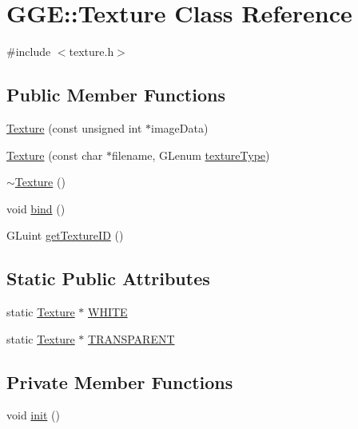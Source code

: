 \hypertarget{class_g_g_e_1_1_texture}{\section{G\+G\+E\+:\+:Texture Class Reference}
\label{class_g_g_e_1_1_texture}
}


{\ttfamily \#include $<$texture.\+h$>$}

\subsection*{Public Member Functions}
\begin{DoxyCompactItemize}
\item 
\hyperlink{class_g_g_e_1_1_texture_af70bbf244600091e968aefc1ab27b73f}{Texture} (const unsigned int $\ast$image\+Data)
\item 
\hyperlink{class_g_g_e_1_1_texture_a3978c92ae0d7bec3aef3006d1cac802b}{Texture} (const char $\ast$filename, G\+Lenum \hyperlink{class_g_g_e_1_1_texture_a9fd9a4cf0a84fcd68b336c92d6d0514e}{texture\+Type})
\item 
\hyperlink{class_g_g_e_1_1_texture_a62700829f86e0b63e0cc4ee04202ee8d}{$\sim$\+Texture} ()
\item 
void \hyperlink{class_g_g_e_1_1_texture_a2c52e20a240d5ec5a9ba3c0d26454546}{bind} ()
\item 
G\+Luint \hyperlink{class_g_g_e_1_1_texture_a5e1ca37555586073c8014dde62c548f0}{get\+Texture\+I\+D} ()
\end{DoxyCompactItemize}
\subsection*{Static Public Attributes}
\begin{DoxyCompactItemize}
\item 
static \hyperlink{class_g_g_e_1_1_texture}{Texture} $\ast$ \hyperlink{class_g_g_e_1_1_texture_a0b90b74276704a2455ba2afa82cc13a7}{W\+H\+I\+T\+E}
\item 
static \hyperlink{class_g_g_e_1_1_texture}{Texture} $\ast$ \hyperlink{class_g_g_e_1_1_texture_a0ce25ba4515c038959da1d389d2c80da}{T\+R\+A\+N\+S\+P\+A\+R\+E\+N\+T}
\end{DoxyCompactItemize}
\subsection*{Private Member Functions}
\begin{DoxyCompactItemize}
\item 
void \hyperlink{class_g_g_e_1_1_texture_a0c017352f8273b7d55216b7ccccaa0ef}{init} ()
\end{DoxyCompactItemize}
